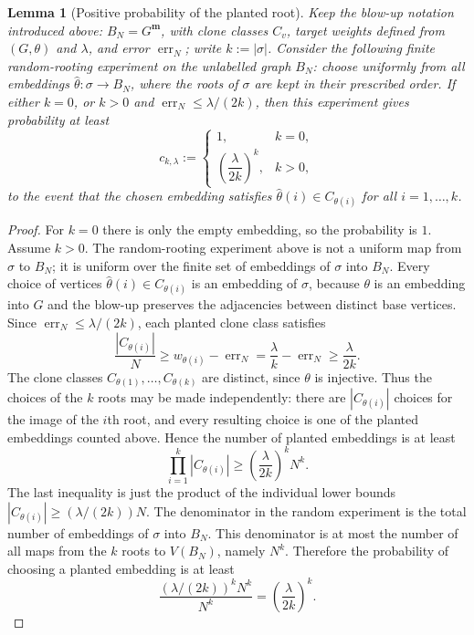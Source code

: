 \documentclass[11pt]{article}
\newtheorem{lemma}[lemma]{Lemma}
\theoremstyle{definition}
\begin{document}
\begin{lemma}[Positive probability of the planted root]\label{lem:planted-mass}
Keep the blow-up notation introduced above: $B_N=G^{\mathbf m}$, with clone
classes $C_v$, target weights defined from $(G,\theta)$ and $\lambda$, and error
$\operatorname{err}_N$; write $k:=|\sigma|$.  Consider the following finite
random-rooting experiment on the unlabelled graph $B_N$: choose uniformly from
all embeddings $\widehat\theta:\sigma\to B_N$, where the roots of
$\sigma$ are kept in their prescribed order.  If either $k=0$, or $k>0$ and
$\operatorname{err}_N\le\lambda/(2k)$, then this experiment gives
probability at least
\[
  c_{k,\lambda}:=
  \begin{cases}
    1, & k=0,\\[1mm]
    \left(\dfrac{\lambda}{2k}\right)^k, & k>0,
  \end{cases}
\]
to the event that the chosen embedding satisfies
$\widehat\theta(i)\in C_{\theta(i)}$ for all $i=1,\ldots,k$.
\end{lemma}

\begin{proof}
For $k=0$ there is only the empty embedding, so the probability is $1$.  Assume
$k>0$.  The random-rooting experiment above is not a uniform map from $\sigma$ to $B_N$;
it is uniform over the finite set of embeddings of $\sigma$ into
$B_N$.  Every choice of vertices
$\widehat\theta(i)\in C_{\theta(i)}$ is an embedding of $\sigma$,
because $\theta$ is an embedding into $G$ and the blow-up preserves the
adjacencies between distinct base vertices.  Since
$\operatorname{err}_N\le\lambda/(2k)$, each planted clone class satisfies
\[
  \frac{|C_{\theta(i)}|}{N}
  \ge
  w_{\theta(i)}-\operatorname{err}_N
  =
  \frac{\lambda}{k}-\operatorname{err}_N
  \ge
  \frac{\lambda}{2k}.
\]
The clone classes $C_{\theta(1)},\ldots,C_{\theta(k)}$ are distinct, since
$\theta$ is injective.  Thus the choices of the $k$ roots may be made
independently: there are $|C_{\theta(i)}|$ choices for the image of the
$i$th root, and every resulting choice is one of the planted embeddings counted above.
Hence the number of planted embeddings is at least
\[
  \prod_{i=1}^k |C_{\theta(i)}|
  \ge
  \left(\frac{\lambda}{2k}\right)^k N^k .
\]
The last inequality is just the product of the individual lower bounds
$|C_{\theta(i)}|\ge(\lambda/(2k))N$.
The denominator in the random experiment is the total number of embeddings of
$\sigma$ into $B_N$.  This denominator is at most the number of all maps from the
$k$ roots to $V(B_N)$, namely $N^k$.  Therefore
the probability of choosing a planted embedding is at least
\[
  \frac{(\lambda/(2k))^kN^k}{N^k}
  =
  \left(\frac{\lambda}{2k}\right)^k .
\]
\end{proof}
\end{document}
